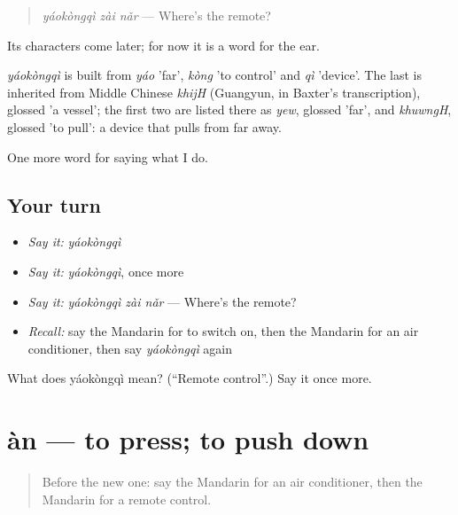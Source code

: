 \begin{quote}
\emph{yáokòngqì zài nǎr} — Where's the remote?
\end{quote}

Its characters come later; for now it is a word for the ear.

\begin{cousinweb}
\emph{yáokòngqì} is built from \emph{yáo} 'far', \emph{kòng} 'to control' and \emph{qì} 'device'. The last is inherited from Middle Chinese \emph{khijH} (Guangyun, in Baxter's transcription), glossed 'a vessel'; the first two are listed there as \emph{yew}, glossed 'far', and \emph{khuwngH}, glossed 'to pull': a device that pulls from far away.
\end{cousinweb}

\begin{grammarlens}[title={What you've built}]
One more word for saying what I do.
\end{grammarlens}

\subsection*{Your turn}
\begin{itemize}
\raggedright
  \item \emph{Say it:} \emph{yáokòngqì}
  \item \emph{Say it:} \emph{yáokòngqì}, once more
  \item \emph{Say it:} \emph{yáokòngqì zài nǎr} — Where's the remote?
  \item \emph{Recall:} say the Mandarin for to switch on, then the Mandarin for an air conditioner, then say \emph{yáokòngqì} again
\end{itemize}

\begin{tcolorbox}[breakable,colback=teal!4,colframe=teal!35!black,title={Before you move on}]
What does yáokòngqì mean? (\textquotedblleft{}Remote control\textquotedblright{}.) Say it once more.
\end{tcolorbox}
\section[àn]{àn — to press; to push down}

\label{lesson:ZH-C171-an}



\begin{quote}
Before the new one: say the Mandarin for an air conditioner, then the Mandarin for a remote control.
\end{quote}

